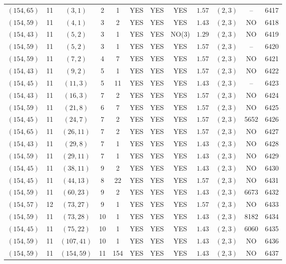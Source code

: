 \begin{longtable}{|c|c|c|c|c|c|c|c|c|c|c|c|}
$(154,65)$ & 11 & $(3,1)$ & 2 & 1 & YES & YES & YES & $1.57$ & $(2,3)$ & -- & 6417\\
$(154,59)$ & 11 & $(4,1)$ & 3 & 2 & YES & YES & YES & $1.43$ & $(2,3)$ & NO & 6418\\
$(154,43)$ & 11 & $(5,2)$ & 3 & 1 & YES & YES & NO(3) & $1.29$ & $(2,3)$ & NO & 6419\\
$(154,59)$ & 11 & $(5,2)$ & 3 & 1 & YES & YES & YES & $1.57$ & $(2,3)$ & -- & 6420\\
$(154,59)$ & 11 & $(7,2)$ & 4 & 7 & YES & YES & YES & $1.57$ & $(2,3)$ & NO & 6421\\
$(154,43)$ & 11 & $(9,2)$ & 5 & 1 & YES & YES & YES & $1.57$ & $(2,3)$ & NO & 6422\\
$(154,45)$ & 11 & $(11,3)$ & 5 & 11 & YES & YES & YES & $1.43$ & $(2,3)$ & -- & 6423\\
$(154,43)$ & 11 & $(16,3)$ & 7 & 2 & YES & YES & YES & $1.57$ & $(2,3)$ & NO & 6424\\
$(154,59)$ & 11 & $(21,8)$ & 6 & 7 & YES & YES & YES & $1.57$ & $(2,3)$ & NO & 6425\\
$(154,45)$ & 11 & $(24,7)$ & 7 & 2 & YES & YES & YES & $1.57$ & $(2,3)$ & 5652 & 6426\\
$(154,65)$ & 11 & $(26,11)$ & 7 & 2 & YES & YES & YES & $1.57$ & $(2,3)$ & NO & 6427\\
$(154,43)$ & 11 & $(29,8)$ & 7 & 1 & YES & YES & YES & $1.43$ & $(2,3)$ & NO & 6428\\
$(154,59)$ & 11 & $(29,11)$ & 7 & 1 & YES & YES & YES & $1.43$ & $(2,3)$ & NO & 6429\\
$(154,45)$ & 11 & $(38,11)$ & 9 & 2 & YES & YES & YES & $1.43$ & $(2,3)$ & NO & 6430\\
$(154,45)$ & 11 & $(44,13)$ & 8 & 22 & YES & YES & YES & $1.57$ & $(2,3)$ & NO & 6431\\
$(154,59)$ & 11 & $(60,23)$ & 9 & 2 & YES & YES & YES & $1.43$ & $(2,3)$ & 6673 & 6432\\
$(154,57)$ & 12 & $(73,27)$ & 9 & 1 & YES & YES & YES & $1.57$ & $(2,3)$ & NO & 6433\\
$(154,59)$ & 11 & $(73,28)$ & 10 & 1 & YES & YES & YES & $1.43$ & $(2,3)$ & 8182 & 6434\\
$(154,45)$ & 11 & $(75,22)$ & 10 & 1 & YES & YES & YES & $1.43$ & $(2,3)$ & 6060 & 6435\\
$(154,59)$ & 11 & $(107,41)$ & 10 & 1 & YES & YES & YES & $1.43$ & $(2,3)$ & NO & 6436\\
$(154,59)$ & 11 & $(154,59)$ & 11 & 154 & YES & YES & YES & $1.43$ & $(2,3)$ & NO & 6437\\

\end{longtable}
